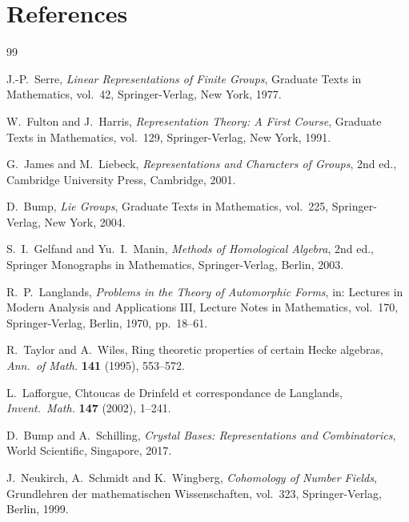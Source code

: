 \documentclass[12pt,a4paper]{amsart}
\theoremstyle{definition}
\begin{document}
\section*{References}

\begin{thebibliography}{99}

J.-P.\ Serre,
\textit{Linear Representations of Finite Groups},
Graduate Texts in Mathematics, vol.~42,
Springer-Verlag, New York, 1977.

W.\ Fulton and J.\ Harris,
\textit{Representation Theory: A First Course},
Graduate Texts in Mathematics, vol.~129,
Springer-Verlag, New York, 1991.

G.\ James and M.\ Liebeck,
\textit{Representations and Characters of Groups},
2nd ed., Cambridge University Press, Cambridge, 2001.

D.\ Bump,
\textit{Lie Groups},
Graduate Texts in Mathematics, vol.~225,
Springer-Verlag, New York, 2004.

S.\ I.\ Gelfand and Yu.\ I.\ Manin,
\textit{Methods of Homological Algebra},
2nd ed., Springer Monographs in Mathematics,
Springer-Verlag, Berlin, 2003.

R.\ P.\ Langlands,
\textit{Problems in the Theory of Automorphic Forms},
in: Lectures in Modern Analysis and Applications III,
Lecture Notes in Mathematics, vol.~170,
Springer-Verlag, Berlin, 1970, pp.~18--61.

R.\ Taylor and A.\ Wiles,
Ring theoretic properties of certain Hecke algebras,
\textit{Ann.\ of Math.} \textbf{141} (1995), 553--572.

L.\ Lafforgue,
Chtoucas de Drinfeld et correspondance de Langlands,
\textit{Invent.\ Math.} \textbf{147} (2002), 1--241.

D.\ Bump and A.\ Schilling,
\textit{Crystal Bases: Representations and Combinatorics},
World Scientific, Singapore, 2017.

J.\ Neukirch, A.\ Schmidt and K.\ Wingberg,
\textit{Cohomology of Number Fields},
Grundlehren der mathematischen Wissenschaften, vol.~323,
Springer-Verlag, Berlin, 1999.

\end{thebibliography}
\end{document}
